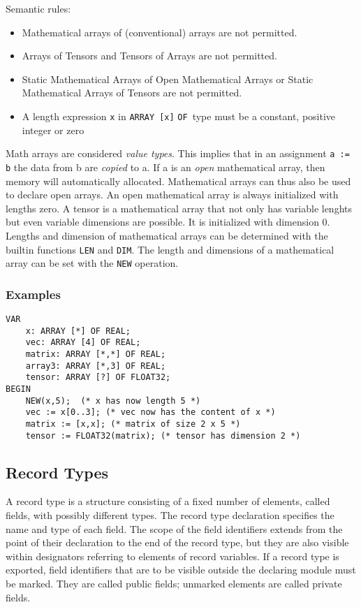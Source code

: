 \documentclass[a4wide,11pt]{article}
\newcommand{\ARRAY}{\lstinline"ARRAY"}
\newcommand{\OF}{\lstinline"OF"}
\begin{document}
Semantic rules:
\begin{itemize}
\item Mathematical arrays of (conventional) arrays are not permitted.
\item Arrays of Tensors and Tensors of Arrays are not permitted.
\item Static Mathematical Arrays of Open Mathematical Arrays or Static Mathematical Arrays of Tensors are not permitted.
\item A length expression \verb~x~ in \ARRAY\ \verb~[x]~ \OF\ type must be a constant, positive integer or zero
\end{itemize}

Math arrays are considered \emph{value types}.
This implies that in an assignment \lstinline"a := b" the data from b are \emph{copied} to a.
If a is an \emph{open} mathematical array, then memory will automatically allocated.
Mathematical arrays can thus also be used to declare open arrays.
An open mathematical array is always initialized with lengths zero.
A tensor is a mathematical array that not only has variable lenghts but even variable dimensions are possible.
It is initialized with dimension 0.
Lengths and dimension of mathematical arrays can be determined with the builtin functions \lstinline"LEN" and \lstinline"DIM".
The length and dimensions of a mathematical array can be set with the \lstinline"NEW" operation.

\begin{annotation}
\subsubsection{Examples}
\begin{lstlisting}[style=example]
VAR
	x: ARRAY [*] OF REAL;
	vec: ARRAY [4] OF REAL;
	matrix: ARRAY [*,*] OF REAL;
	array3: ARRAY [*,3] OF REAL;
	tensor: ARRAY [?] OF FLOAT32;
BEGIN
	NEW(x,5);  (* x has now length 5 *)
	vec := x[0..3]; (* vec now has the content of x *)
	matrix := [x,x]; (* matrix of size 2 x 5 *)
	tensor := FLOAT32(matrix); (* tensor has dimension 2 *)
\end{lstlisting}
\end{annotation}

\subsection{Record Types}

A record type is a structure consisting of a fixed number of elements, called fields, with possibly different types.
The record type declaration specifies the name and type of each field.
The scope of the field identifiers extends from the point of their declaration to the end of the record type, but they are also visible within designators referring to elements of record variables.
If a record type is exported, field identifiers that are to be visible outside the declaring module must be marked.
They are called public fields; unmarked elements are called private fields.
\end{document}
